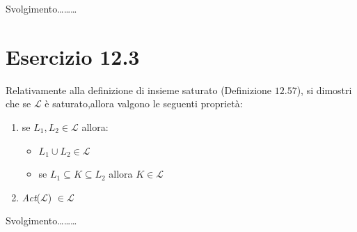 		\sectionline
		
		\qquad Svolgimento\ldots\ldots\ldots
		
		\newpage
		
	\section{Esercizio 12.3}
		\qquad Relativamente alla definizione di insieme saturato (Definizione
		$12.57$), si dimostri che se $\mathcal{L}$ \`e saturato,allora valgono le
		seguenti propriet\`a:
		\begin{enumerate}
		  \item se $L_1,L_2 \in \mathcal{L}$ allora:
		  \begin{itemize}
		    \item $L_1 \cup L_2 \in \mathcal{L}$
		    \item se $L_1 \subseteq K \subseteq L_2$ allora $K \in \mathcal{L}$
		  \end{itemize}
		  \item \emph{Act}($\mathcal{L}$) $\in \mathcal{L}$
		\end{enumerate}
		
		\sectionline
		
		\qquad Svolgimento\ldots\ldots\ldots
